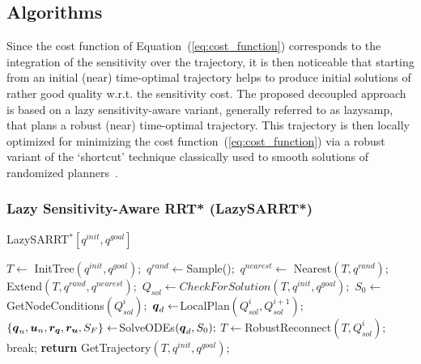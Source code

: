 \subsection{Algorithms}

Since the cost function of Equation~(\ref{eq:cost_function}) corresponds to the integration of the sensitivity over the trajectory, it is then noticeable that starting from an initial (near) time-optimal trajectory helps to produce initial solutions of rather good quality w.r.t. the sensitivity cost.
The proposed decoupled approach is based on a lazy sensitivity-aware variant, generally referred to as \gls{lazysamp}, that plans a robust (near) time-optimal trajectory.
This trajectory is then locally optimized for minimizing the cost function~(\ref{eq:cost_function}) via a robust variant of the `shortcut' technique classically used to smooth solutions of randomized planners~\cite{cShortcut}. 

\subsubsection{Lazy Sensitivity-Aware RRT* (LazySARRT*)}\label{sec:lazy_rrt*}

\begin{algorithm}[h]
    \caption{LazySARRT$^* [q^{init}, q^{goal}]$}\label{alg:LazySARRT*}
    \begin{algorithmic}[1]
        \State $T \gets$ InitTree$({q^{init}, q^{goal}});$
            \State $q^{rand} \gets $Sample()$;$
            \State $q^{nearest} \gets$ Nearest$(T,{q^{rand}});$
            \State Extend$(T, q^{rand}, q^{nearest});$
            \State $Q_{sol} \gets CheckForSolution(T, q^{init}, q^{goal});$
                    \State $S_0 \gets $GetNodeConditions$(Q_{sol}^{i});$
                    \State $\boldsymbol{q}_d \gets $LocalPlan$(Q_{sol}^{i}, Q_{sol}^{i+1});$
                    \State $\left \{\boldsymbol{q}_n, \boldsymbol{u}_n, \boldsymbol{r_q}, \boldsymbol{r_u}, S_F \right \}  \gets $SolveODEs$(\boldsymbol{q}_d, S_0);$
                        \State $T \gets $RobustReconnect$(T, Q_{sol}^{i});$
                        \State break;
                    \EndIf
                \EndFor
            \EndIf
        \EndWhile
        \State \textbf{return} GetTrajectory$(T, q^{init}, q^{goal})$;
    \end{algorithmic}
\end{algorithm}


